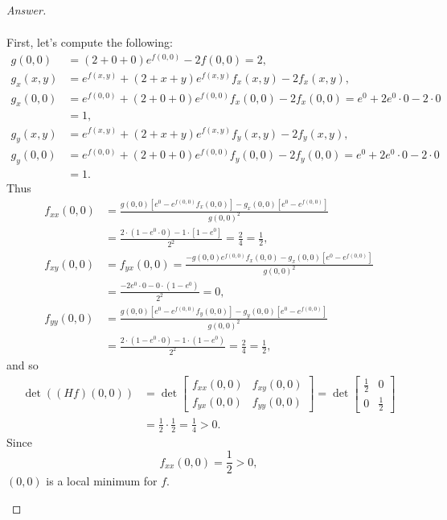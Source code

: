 \documentclass[12pt]{article}
\newcommand\paren[1]{\left( #1 \right)}
\newcommand{\sqbrack}[1]{\left [ #1 \right ]}
\theoremstyle{definition}
\begin{document}
\begin{proof}[Answer]
\begin{enumerate}[(a)]
\begin{align*}
        \end{align*}
        First, let's compute the following: 
        \begin{align*}
            g(0,0) & = (2+0+0) e^{f(0,0)} - 2f(0,0) = 2 , \\ 
            g_{x}(x,y) & = e^{f(x,y)} + (2+x+y) e^{f(x,y)} f_{x}(x,y) - 2 f_{x}(x,y) , \\ 
            g_{x}(0,0) & = e^{f(0,0)} + (2+0+0) e^{f(0,0)} f_{x}(0,0) - 2 f_{x}(0,0) = e^0 + 2 e^0 \cdot 0 - 2 \cdot 0 \\ 
            & = 1 , \\ 
            g_{y}(x,y) & = e^{f(x,y)} + (2+x+y) e^{f(x,y)} f_{y}(x,y) - 2 f_{y}(x,y) , \\ 
            g_{y}(0,0) & = e^{f(0,0)} + (2+0+0) e^{f(0,0)} f_{y}(0,0) - 2 f_{y}(0,0) = e^0 + 2 e^0 \cdot 0 - 2 \cdot 0 \\ 
            & = 1 . 
        \end{align*}
        Thus 
        \begin{align*}
            f_{xx}(0,0) & = \frac{ g(0,0) \sqbrack{ e^0 - e^{f(0,0)} f_{x}(0,0) } - g_{x}(0,0) \sqbrack{ e^{0} - e^{f(0,0)} } }{ g(0,0)^2 } \\ 
            & = \frac{ 2 \cdot \paren{ 1 - e^{0} \cdot 0 } - 1 \cdot \sqbrack{ 1 - e^{0} } }{ 2^2 } = \frac{2}{4} = \frac{1}{2} , \\ 
            f_{xy}(0,0) & = f_{yx}(0,0) = \frac{ -g(0,0) e^{f(0,0)  } f_{x}(0,0) - g_{x}(0,0) \sqbrack{ e^{0} - e^{f(0,0)} } }{ g(0,0)^2 } \\ 
            & = \frac{-2 e^0 \cdot 0 - 0 \cdot \paren{ 1 - e^0 }}{2^2} = 0 , \\ 
            f_{yy}(0,0) & = \frac{ g(0,0) \sqbrack{ e^0 - e^{f(0,0)} f_{y}(0,0) } - g_{y}(0,0) \sqbrack{ e^{0} - e^{f(0,0)} } }{ g(0,0)^2 } \\ 
            & = \frac{ 2 \cdot \paren{ 1 - e^0 \cdot 0 } - 1 \cdot \paren{ 1 - e^0 } }{2^2} = \frac{2}{4} = \frac{1}{2} ,
        \end{align*}
        and so 
        \begin{align*}
            \det \paren{ (Hf)(0,0) } & = 
            \det 
            \begin{bmatrix}
                f_{xx}(0,0) & f_{xy}(0,0) \\ 
                f_{yx}(0,0) & f_{yy}(0,0)
            \end{bmatrix}
            =
            \det 
            \begin{bmatrix}
                \frac{1}{2} & 0 \\ 
                0 & \frac{1}{2}
            \end{bmatrix} \\ 
            & = \frac{1}{2} \cdot \frac{1}{2} = \frac{1}{4} > 0 . 
        \end{align*}
        Since 
        \[
            f_{xx}(0,0) = \frac{1}{2} > 0 , 
        \]
        $(0,0)$ is a local minimum for $f$. 
    \end{enumerate}
\end{proof}
\end{document}
